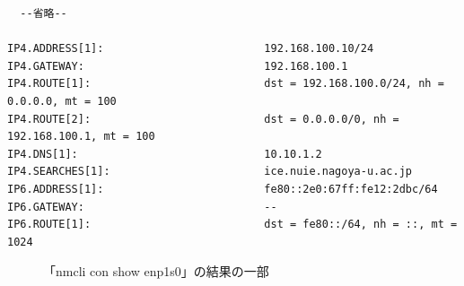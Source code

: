 \documentclass{ltjsarticle} %
\begin{document}
\begin{mdframed}
\begin{verbatim}
  --省略--

IP4.ADDRESS[1]:                         192.168.100.10/24
IP4.GATEWAY:                            192.168.100.1
IP4.ROUTE[1]:                           dst = 192.168.100.0/24, nh = 0.0.0.0, mt = 100
IP4.ROUTE[2]:                           dst = 0.0.0.0/0, nh = 192.168.100.1, mt = 100
IP4.DNS[1]:                             10.10.1.2
IP4.SEARCHES[1]:                        ice.nuie.nagoya-u.ac.jp
IP6.ADDRESS[1]:                         fe80::2e0:67ff:fe12:2dbc/64
IP6.GATEWAY:                            --
IP6.ROUTE[1]:                           dst = fe80::/64, nh = ::, mt = 1024
  \end{verbatim}
  \end{mdframed}
  \begin{figure}[H]
  \caption{「nmcli con show enp1s0」の結果の一部}
  \label{fig:enp1s0}
\end{figure}
\end{document}
